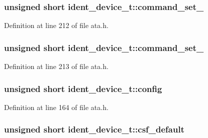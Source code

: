 \subsubsection[{\texorpdfstring{command\+\_\+set\+\_\+1}{command_set_1}}]{\setlength{\rightskip}{0pt plus 5cm}unsigned short ident\+\_\+device\+\_\+t\+::command\+\_\+set\+\_}\hypertarget{structident__device__t_a4eb0292566454e00ecba5e5a0d8e613f}{}\label{structident__device__t_a4eb0292566454e00ecba5e5a0d8e613f}


Definition at line 212 of file ata.\+h.

\subsubsection[{\texorpdfstring{command\+\_\+set\+\_\+2}{command_set_2}}]{\setlength{\rightskip}{0pt plus 5cm}unsigned short ident\+\_\+device\+\_\+t\+::command\+\_\+set\+\_}\hypertarget{structident__device__t_abd3639653bdac02a650a0c263e2d6dc3}{}\label{structident__device__t_abd3639653bdac02a650a0c263e2d6dc3}


Definition at line 213 of file ata.\+h.

\subsubsection[{\texorpdfstring{config}{config}}]{\setlength{\rightskip}{0pt plus 5cm}unsigned short ident\+\_\+device\+\_\+t\+::config}\hypertarget{structident__device__t_a244665cc61b5b3e5fcec35242a01fc9b}{}\label{structident__device__t_a244665cc61b5b3e5fcec35242a01fc9b}


Definition at line 164 of file ata.\+h.

\subsubsection[{\texorpdfstring{csf\+\_\+default}{csf_default}}]{\setlength{\rightskip}{0pt plus 5cm}unsigned short ident\+\_\+device\+\_\+t\+::csf\+\_\+default}\hypertarget{structident__device__t_a47ec6f0b2fe379bdd5af96c966c3cf26}{}\label{structident__device__t_a47ec6f0b2fe379bdd5af96c966c3cf26}


